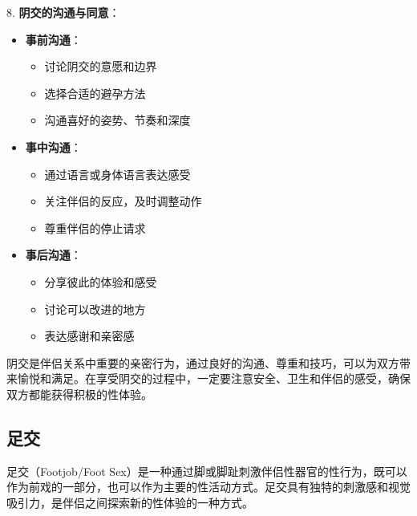 \documentclass[12pt,UTF8]{ctexbook}
\begin{document}
8. \textbf{阴交的沟通与同意}：
\begin{itemize}
	\item \textbf{事前沟通}：
	\begin{itemize}
		\item 讨论阴交的意愿和边界
		\item 选择合适的避孕方法
		\item 沟通喜好的姿势、节奏和深度
	\end{itemize}
	\item \textbf{事中沟通}：
	\begin{itemize}
		\item 通过语言或身体语言表达感受
		\item 关注伴侣的反应，及时调整动作
		\item 尊重伴侣的停止请求
	\end{itemize}
	\item \textbf{事后沟通}：
	\begin{itemize}
		\item 分享彼此的体验和感受
		\item 讨论可以改进的地方
		\item 表达感谢和亲密感
	\end{itemize}
\end{itemize}

阴交是伴侣关系中重要的亲密行为，通过良好的沟通、尊重和技巧，可以为双方带来愉悦和满足。在享受阴交的过程中，一定要注意安全、卫生和伴侣的感受，确保双方都能获得积极的性体验。

\subsection{足交}

足交（Footjob/Foot Sex）是一种通过脚或脚趾刺激伴侣性器官的性行为，既可以作为前戏的一部分，也可以作为主要的性活动方式。足交具有独特的刺激感和视觉吸引力，是伴侣之间探索新的性体验的一种方式。
\end{document}

